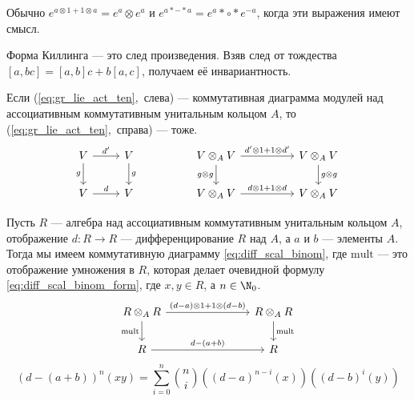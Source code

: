 \documentclass[
	extrafontsizes,
	11pt,
	hyphens,
]{memoir}
\begin{document}
\begin{observation}
Обычно \(e^{a \otimes 1 + 1 \otimes a} = e^a \otimes e^a\) и \(e^{a* - *a} = e^a* \circ *e^{-a}\), когда эти выражения имеют смысл.
\end{observation}

\begin{observation}%
Форма Киллинга --- это след произведения. Взяв след от тождества
\([a,bc]=[a,b]c+b[a,c]\), получаем её инвариантность.
\end{observation}

\begin{observation}
Если (\ref{eq:gr_lie_act_ten},~слева) --- коммутативная диаграмма модулей над ассоциативным коммутативным унитальным кольцом \(A\), то (\ref{eq:gr_lie_act_ten},~справа) --- тоже.
\begin{equation}
\label{eq:gr_lie_act_ten}
\begin{tikzcd}
V \ar{r}{d'} \ar[swap]{d}{g} &
V \ar{d}{g} &
&
V \otimes_A V \ar{rr}{d' \otimes 1 + 1 \otimes d'} \ar[swap]{d}{g \otimes g} &
&
V \otimes_A V \ar{d}{g \otimes g}
\\
V \ar{r}{d} &
V &
&
V \otimes_A V \ar{rr}{d \otimes 1 + 1 \otimes d} &
&
V \otimes_A V
\end{tikzcd}
\end{equation}
\end{observation}

\begin{observation}
Пусть \(R\) --- алгебра над ассоциативным коммутативным унитальным кольцом \(A\), отображение \(d : R \to R\) --- дифференцирование \(R\) над \(A\), а \(a\) и \(b\) --- элементы \(A\).
Тогда мы имеем коммутативную диаграмму \eqref{eq:diff_scal_binom}, где \(\mathrm{mult}\) --- это отображение умножения в \(R\), которая делает очевидной формулу \eqref{eq:diff_scal_binom_form}, где \(x,y \in R\), а \(n \in \N_0\).
\begin{equation}
\label{eq:diff_scal_binom}
\begin{tikzcd}[column sep = 7.5em]
R \otimes_A R \ar[swap]{d}{\mathrm{mult}} \ar{r}{(d-a) \otimes 1 + 1 \otimes (d-b)} &
R \otimes_A R \ar{d}{\mathrm{mult}}
\\
R \ar{r}{d - (a + b)} &
R
\end{tikzcd}
\end{equation}
\begin{equation}
\label{eq:diff_scal_binom_form}
(d - (a + b))^n (xy) =
\sum_{i=0}^n \binom{n}{i} ((d - a)^{n-i} (x)) ((d - b)^i (y))
\end{equation}
\end{observation}
\end{document}
